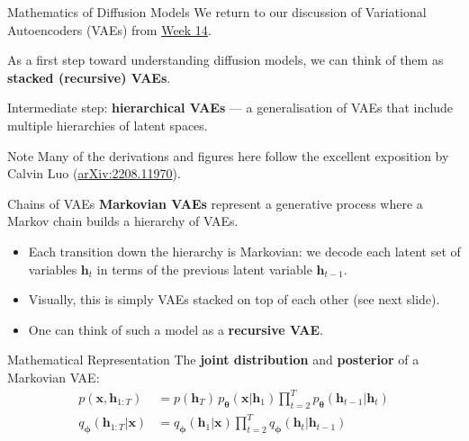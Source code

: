 \documentclass[aspectratio=169,10pt]{beamer}
\newcommand{\bx}{\bm{x}}
\newcommand{\bh}{\bm{h}}
\newcommand{\bphi}{\bm{\phi}}
\newcommand{\btheta}{\bm{\theta}}
\begin{document}
\begin{frame}{Mathematics of Diffusion Models}
  We return to our discussion of Variational Autoencoders (VAEs) from
  \href{https://github.com/CompPhysics/AdvancedMachineLearning/blob/main/doc/pub/week14/ipynb/week14.ipynb}{Week 14}.

  \vspace{6pt}
  As a first step toward understanding diffusion models, we can think of them
  as \textbf{stacked (recursive) VAEs}.

  \vspace{6pt}
  Intermediate step: \textbf{hierarchical VAEs} — a generalisation of VAEs
  that include multiple hierarchies of latent spaces.

  \vspace{4pt}
  \begin{alertblock}{Note}
    Many of the derivations and figures here follow the excellent exposition by
    Calvin Luo (\href{https://arxiv.org/abs/2208.11970}{arXiv:2208.11970}).
  \end{alertblock}
\end{frame}

\begin{frame}{Chains of VAEs}
  \textbf{Markovian VAEs} represent a generative process where a Markov chain
  builds a hierarchy of VAEs.
  \begin{itemize}
    \item Each transition down the hierarchy is Markovian: we decode each latent
          set of variables $\bh_t$ in terms of the previous latent variable
          $\bh_{t-1}$.
    \item Visually, this is simply VAEs stacked on top of each other
          (see next slide).
    \item One can think of such a model as a \textbf{recursive VAE}.
  \end{itemize}
\end{frame}

\begin{frame}{Mathematical Representation}
  The \textbf{joint distribution} and \textbf{posterior} of a Markovian VAE:
  \begin{align*}
    p(\bx, \bh_{1:T})
    &= p(\bh_T)\,p_{\btheta}(\bx|\bh_1)
       \prod_{t=2}^{T} p_{\btheta}(\bh_{t-1}|\bh_t) \\[4pt]
    q_{\bphi}(\bh_{1:T}|\bx)
    &= q_{\bphi}(\bh_1|\bx)
       \prod_{t=2}^{T} q_{\bphi}(\bh_t|\bh_{t-1})
  \end{align*}
\end{frame}
\end{document}
